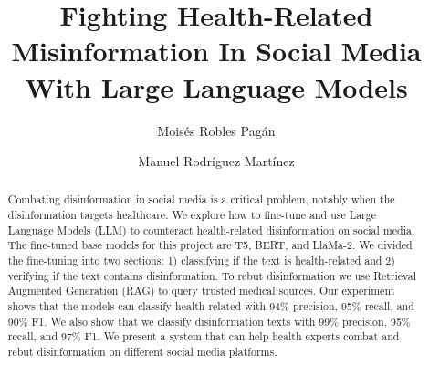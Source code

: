 \documentclass{svproc}
\begin{document}
\mainmatter              %
%
\title{Fighting Health-Related Misinformation In Social Media With Large Language Models}
%
%
\author{Mois\'es Robles Pag\'an \and Manuel Rodr\'iguez Mart\'inez}
%
%


\maketitle              %


\begin{abstract}
Combating disinformation in social media is a critical problem, notably when the disinformation targets healthcare. We explore how to fine-tune and use Large Language Models (LLM) to counteract health-related disinformation on social media. The fine-tuned base models for this project are T5, BERT, and LlaMa-2. We divided the fine-tuning into two sections: 1) classifying if the text is health-related and 2) verifying if the text contains disinformation. To rebut disinformation we use Retrieval Augmented Generation (RAG) to query trusted medical sources. Our experiment shows that the models can classify health-related with 94\% precision, 95\% recall, and 90\% F1. We also show that we classify disinformation texts with 99\% precision, 95\% recall, and 97\% F1. We present a system that can help health experts combat and rebut disinformation on different social media platforms.
\end{abstract}











%
%

\end{document}
